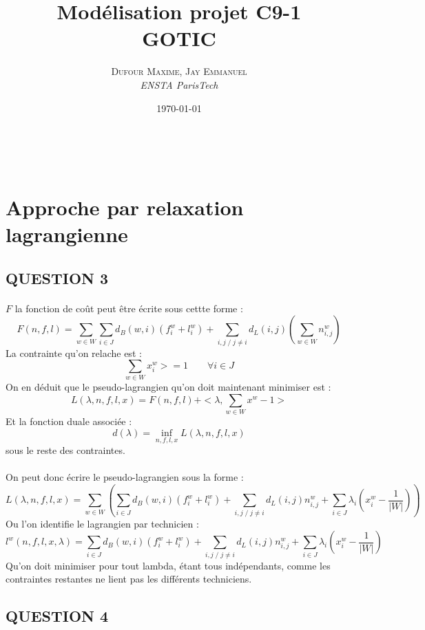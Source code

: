 \documentclass[a4paper, 11pt]{article} %
\title{\textbf{Modélisation projet C9-1}\\ %
GOTIC} %
\author{\textsc{Dufour Maxime, Jay Emmanuel} %
\\{\textit{ENSTA ParisTech}}} %
\date{\today} %
\makeatletter
\renewcommand{\maketitle}{ %
\begin{flushright} %
{\LARGE\@title} %

\vspace{30pt} %

{\large\@author} %
\\\@date %

\vspace{20pt} %
\end{flushright}
}
\makeatother
\begin{document}
\vspace{200pt}

\maketitle %

\section{Approche par relaxation lagrangienne}

\subsection*{QUESTION 3}

\paragraph*{}
$F$ la fonction de coût peut être écrite sous cettte forme :
$$ F(n,f,l) = \sum_{w \in W} \sum_{i \in J} d_B(w,i)(f_i^w + l_i^w)
            + \sum_{i,j\; / \;j \ne i} d_L(i,j)(\sum_{w \in W} n_{i,j}^w) $$ 
La contrainte qu'on relache est :
$$ \sum_{w \in W} x_i^w >= 1 \qquad \forall i \in J $$
On en déduit que le pseudo-lagrangien qu'on doit maintenant minimiser est :
$$ L(\lambda,n,f,l,x) = F(n,f,l) + <\lambda,\sum_{w \in W} x^w - 1> $$
Et la fonction duale associée :
$$ d(\lambda) = \inf_{n,f,l,x} {L(\lambda,n,f,l,x) } $$ 
sous le reste des contraintes.

\paragraph*{}
On peut donc écrire le pseudo-lagrangien sous la forme : 
$$ L(\lambda,n,f,l,x) = \sum_{w \in W} (\sum_{i \in J} d_B(w,i)(f_i^w + l_i^w)
            + \sum_{i,j\; / \;j \ne i} d_L(i,j) n_{i,j}^w + \sum_{i \in J} \lambda_i(x^w_i-\frac{1}{|W|}) ) $$
Ou l'on identifie le lagrangien par technicien : 
$$ l^w(n,f,l,x,\lambda) = \sum_{i \in J} d_B(w,i)(f_i^w + l_i^w)
            + \sum_{i,j\; / \;j \ne i} d_L(i,j) n_{i,j}^w + \sum_{i \in J} \lambda_i(x^w_i-\frac{1}{|W|}) $$
Qu'on doit minimiser pour tout lambda, étant tous indépendants, comme les contraintes restantes ne lient pas les différents techniciens.

\subsection*{QUESTION 4}
\end{document}
